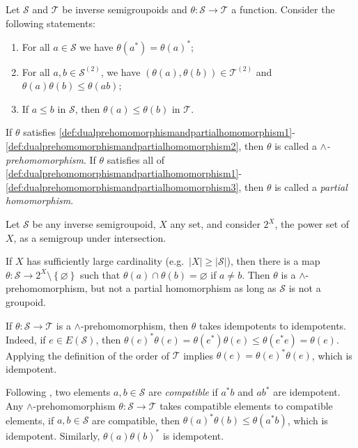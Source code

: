 \begin{definition}\label{def:dualprehomomorphismandpartialhomomorphism}
Let $\mathcal{S}$ and $\mathcal{T}$ be inverse semigroupoids and $\theta\colon\mathcal{S}\to\mathcal{T}$ a function. Consider the following statements:
\begin{enumerate}[label=(\roman*)]
\item\label{def:dualprehomomorphismandpartialhomomorphism1} For all $a\in\mathcal{S}$ we have $\theta(a^*)=\theta(a)^*$;
\item\label{def:dualprehomomorphismandpartialhomomorphism2} For all $a,b\in\mathcal{S}^{(2)}$, we have $(\theta(a),\theta(b))\in\mathcal{T}^{(2)}$ and $\theta(a)\theta(b)\leq\theta(ab)$;
\item\label{def:dualprehomomorphismandpartialhomomorphism3} If $a\leq b$ in $\mathcal{S}$, then $\theta(a)\leq\theta(b)$ in $\mathcal{T}$.
\end{enumerate}
If $\theta$ satisfies \ref{def:dualprehomomorphismandpartialhomomorphism1}-\ref{def:dualprehomomorphismandpartialhomomorphism2}, then $\theta$ is called a \emph{$\land$-prehomomorphism}. If $\theta$ satisfies all of \ref{def:dualprehomomorphismandpartialhomomorphism1}-\ref{def:dualprehomomorphismandpartialhomomorphism3}, then $\theta$ is called a \emph{partial homomorphism}.
\end{definition}

\begin{example}
Let $\mathcal{S}$ be any inverse semigroupoid, $X$ any set, and consider $2^X$, the power set of $X$, as a semigroup under intersection.

If $X$ has sufficiently large cardinality (e.g.\ $|X|\geq|\mathcal{S}|$), then there is a map $\theta\colon\mathcal{S}\to 2^X\setminus\left\{\varnothing\right\}$ such that $\theta(a)\cap\theta(b)=\varnothing$ if $a\neq b$. Then $\theta$ is a $\land$-prehomomorphism, but not a partial homomorphism as long as $\mathcal{S}$ is not a groupoid.
\end{example}

If $\theta\colon\mathcal{S}\to\mathcal{T}$ is a $\land$-prehomomorphism, then $\theta$ takes idempotents to idempotents. Indeed, if $e\in E(\mathcal{S})$, then $\theta(e)^*\theta(e)=\theta(e^*)\theta(e)\leq\theta(e^*e)=\theta(e)$. Applying the definition of the order of $\mathcal{T}$ implies $\theta(e)=\theta(e)^*\theta(e)$, which is idempotent.

Following \cite[p.\ 12]{MR1694900}, two elements $a,b\in\mathcal{S}$ are \emph{compatible} if $a^*b$ and $ab^*$ are idempotent. Any $\land$-prehomomorphism $\theta\colon\mathcal{S}\to\mathcal{T}$ takes compatible elements to compatible elements, if $a,b\in\mathcal{S}$ are compatible, then $\theta(a)^*\theta(b)\leq\theta(a^*b)$, which is idempotent. Similarly, $\theta(a)\theta(b)^*$ is idempotent.

